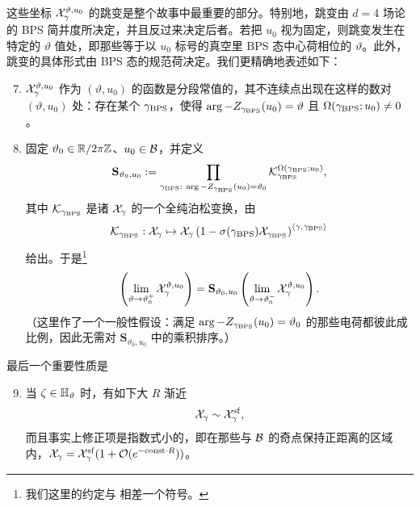 这些坐标 $\mathcal{X}_\gamma^{\vartheta, u_0}$ 的跳变是整个故事中最重要的部分。特别地，跳变由 $d=4$ 场论的 BPS 简并度所决定，并且反过来决定后者。若把 $u_0$ 视为固定，则跳变发生在特定的 $\vartheta$ 值处，即那些等于以 $u_0$ 标号的真空里 BPS 态中心荷相位的 $\vartheta$。此外，跳变的具体形式由 BPS 态的规范荷决定。我们更精确地表述如下：

\begin{enumerate}[label=\alph*)]
\setcounter{enumi}{6}

\item $\mathcal{X}_\gamma^{\vartheta, u_0}$ 作为 $(\vartheta, u_0)$ 的函数是分段常值的，其不连续点出现在这样的数对 $(\vartheta, u_0)$ 处：存在某个 $\gamma_{\rm BPS}$，使得 $\arg -Z_{\gamma_{\rm BPS}}(u_0) = \vartheta$ 且 $\Omega(\gamma_{\rm BPS}; u_0) \neq 0$。

\item 固定 $\vartheta_0 \in \mathbb{R}/2\pi\mathbb{Z}$、$u_0 \in \mathcal{B}$，并定义
\begin{equation} \label{ch2:eq:Sdef}
\mathbf{S}_{\vartheta_0, u_0} := \prod_{\gamma_{\rm BPS}: \ \arg -Z_{\gamma_{\rm BPS}}(u_0) = \vartheta_0} \mathcal{K}_{\gamma_{\rm BPS}}^{\Omega(\gamma_{\rm BPS}; u_0)},
\end{equation}
其中 $\mathcal{K}_{\gamma_{\rm BPS}}$ 是诸 $\mathcal{X}_\gamma$ 的一个全纯泊松变换，由
\begin{equation} \label{ch2:eq:KStransf}
\mathcal{K}_{\gamma_{\rm BPS}}: \mathcal{X}_{\gamma} \mapsto \mathcal{X}_{\gamma} \left( 1-\sigma(\gamma_{\rm BPS}) \mathcal{X}_{\gamma_{\rm BPS}} \right)^{\langle \gamma, \gamma_{\rm BPS} \rangle}
\end{equation}
给出。于是\footnote{我们这里的约定与 \cite{Gaiotto:2008cd} 相差一个符号。}
\begin{equation} \label{ch2:eq:jump}
\left( \lim_{\vartheta \to \vartheta_0^+} \mathcal{X}^{\vartheta, u_0}_\gamma \right) = \mathbf{S}_{\vartheta_0, u_0} \left( \lim_{\vartheta \to \vartheta_0^-} \mathcal{X}^{\vartheta, u_0}_\gamma \right).
\end{equation}
（这里作了一个一般性假设：满足 $\arg -Z_{\gamma_{\rm BPS}}(u_0) = \vartheta_0$ 的那些电荷都彼此成比例，因此无需对 $\mathbf{S}_{\vartheta_0, u_0}$ 中的乘积排序。）

\end{enumerate}

最后一个重要性质是

\begin{enumerate}[label=\alph*)]
\setcounter{enumi}{8}

\item 当 $\zeta \in {\mathbb{H}}_\vartheta$ 时，有如下大 $R$ 渐近
\begin{equation} \label{ch2:eq:largeR}
\mathcal{X}_{\gamma} \sim \mathcal{X}^{{\mathrm{sf}}}_{\gamma},
\end{equation}
而且事实上修正项是指数式小的，即在那些与 $\mathcal{B}$ 的奇点保持正距离的区域内，$\mathcal{X}_\gamma = \mathcal{X}^{{\mathrm{sf}}}_\gamma (1 + \mathcal{O}(e^{-{\rm const} \cdot R}))$。

\end{enumerate}

